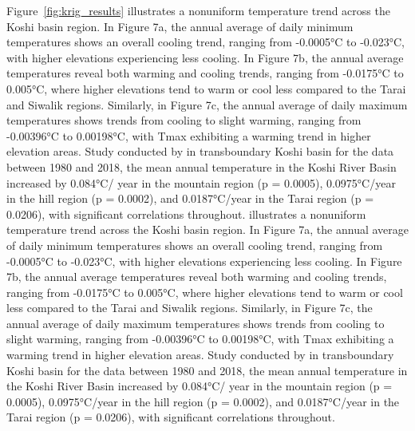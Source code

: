 Figure~\ref{fig:krig_results} illustrates a nonuniform temperature trend across the Koshi basin region. In Figure 7a, the annual average of daily minimum temperatures shows an overall cooling trend, ranging from -0.0005°C to -0.023°C, with higher elevations experiencing less cooling. In Figure 7b, the annual average temperatures reveal both warming and cooling trends, ranging from -0.0175°C to 0.005°C, where higher elevations tend to warm or cool less compared to the Tarai and Siwalik regions. Similarly, in Figure 7c, the annual average of daily maximum temperatures shows trends from cooling to slight warming, ranging from -0.00396°C to 0.00198°C, with Tmax exhibiting a warming trend in higher elevation areas. Study conducted by \citep{paudel_climate_2021} in transboundary Koshi basin for the data between 1980 and 2018, the mean annual temperature in the Koshi River Basin increased by 0.084°C/ year in the mountain region (p = 0.0005), 0.0975°C/year in the hill region (p = 0.0002), and 0.0187°C/year in the Tarai region (p = 0.0206), with significant correlations throughout.  illustrates a nonuniform temperature trend across the Koshi basin region. In Figure 7a, the annual average of daily minimum temperatures shows an overall cooling trend, ranging from -0.0005°C to -0.023°C, with higher elevations experiencing less cooling. In Figure 7b, the annual average temperatures reveal both warming and cooling trends, ranging from -0.0175°C to 0.005°C, where higher elevations tend to warm or cool less compared to the Tarai and Siwalik regions. Similarly, in Figure 7c, the annual average of daily maximum temperatures shows trends from cooling to slight warming, ranging from -0.00396°C to 0.00198°C, with Tmax exhibiting a warming trend in higher elevation areas. Study conducted by \citet{paudel_climate_2021} in transboundary Koshi basin for the data between 1980 and 2018, the mean annual temperature in the Koshi River Basin increased by 0.084°C/ year in the mountain region (p = 0.0005), 0.0975°C/year in the hill region (p = 0.0002), and 0.0187°C/year in the Tarai region (p = 0.0206), with significant correlations throughout. 

